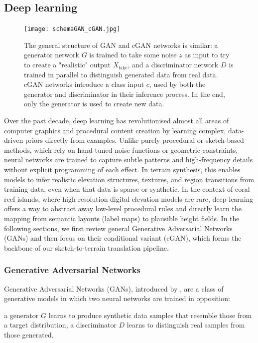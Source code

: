 

\subsection{Deep learning}
\label{sec:coral-island-sota-deep-learning}

\begin{figure}
    \texttt{[image: schemaGAN\_cGAN.jpg]}
    \caption{The general structure of GAN and cGAN networks is similar: a generator network $G$ is trained to take some noise $z$ as input to try to create a "realistic" output $X_{\text{fake}}$, and a discriminator network $D$ is trained in parallel to distinguish generated data from real data. cGAN networks introduce a class input $c$, used by both the generator and discriminator in their inference process. In the end, only the generator is used to create new data.}
    \label{fig:coral-island-GAN-scheme}
\end{figure}

Over the past decade, deep learning has revolutionised almost all areas of computer graphics and procedural content creation by learning complex, data-driven priors directly from examples. Unlike purely procedural or sketch-based methods, which rely on hand-tuned noise functions or geometric constraints, neural networks are trained to capture subtle patterns and high-frequency details without explicit programming of each effect. In terrain synthesis, this enables models to infer realistic elevation structures, textures, and region transitions from training data, even when that data is sparse or synthetic. In the context of coral reef islands, where high-resolution digital elevation models are rare, deep learning offers a way to abstract away low-level procedural rules and directly learn the mapping from semantic layouts (label maps) to plausible height fields. In the following sections, we first review general Generative Adversarial Networks (GANs) and then focus on their conditional variant (cGAN), which forms the backbone of our sketch-to-terrain translation pipeline.

\subsubsection{Generative Adversarial Networks}
\label{sec:coral-island-sota-GAN}

Generative Adversarial Networks (GANs), introduced by \cite{Goodfellow2014}, are a class of generative models in which two neural networks are trained in opposition: 
\begin{Itemize}
    \Item{} a generator $G$ learns to produce synthetic data samples that resemble those from a target distribution, 
    \Item{} a discriminator $D$ learns to distinguish real samples from those generated. 
\end{Itemize}

